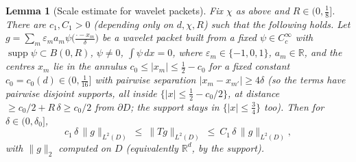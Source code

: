 \documentclass[11pt]{article}
\newtheorem{lemma}[theorem]{Lemma}
\theoremstyle{remark}
\newcommand{\R}{\mathbb{R}}
\newcommand{\norm}[1]{\lVert #1\rVert}
\newcommand{\abs}[1]{\lvert #1\rvert}
\newcommand{\SET}[1]{\{#1\}}
\DeclareMathOperator{\supp}{supp}
\begin{document}
\begin{lemma}[Scale estimate for wavelet packets]\label{lem:scale2}
Fix $\chi$ as above and $R\in(0,\tfrac18]$. There are $c_1,C_1>0$
(depending only on $d,\chi,R$) such that the following holds. Let
$g=\sum_{m}\varepsilon_m a_m\psi\bigl(\tfrac{\cdot-x_m}{\delta}\bigr)$ be a
wavelet packet built from a fixed $\psi\in C^\infty_c$ with
$\supp\psi\subset B(0,R)$, $\psi\ne0$, $\int\psi\,dx=0$, where
$\varepsilon_m\in\{-1,0,1\}$, $a_m\in\R$, and the centres $x_m$ lie in the
\emph{annulus} $c_0\le\abs{x_m}\le\tfrac12-c_0$ for a fixed constant
$c_0=c_0(d)\in(0,\tfrac{1}{16}]$ with pairwise separation
$\abs{x_m-x_{m'}}\ge4\delta$ (so the terms have pairwise disjoint supports,
all inside $\SET{\abs x\le\tfrac12-c_0/2}$, at distance
$\ge c_0/2+R\,\delta\ge c_0/2$ from $\partial D$; the support stays in
$\SET{\abs x\le\tfrac34}$ too). Then for $\delta\in(0,\delta_0]$,
\begin{equation}\label{eq:scale2}
c_1\,\delta\,\norm{g}_{L^{2}(D)}
\ \le\ \norm{Tg}_{L^{2}(D)}
\ \le\ C_1\,\delta\,\norm{g}_{L^{2}(D)},
\end{equation}
with $\norm{g}_2$ computed on $D$ (equivalently $\R^d$, by the support).
\end{lemma}
\end{document}
